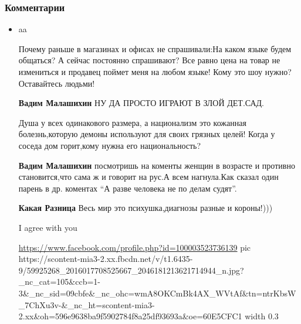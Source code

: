  
 
 
 
 
\clearpage
\subsubsection{Комментарии}
\label{sec:18_06_2020.fb.zharkih_ekaterina.1.mova_jazyk.cmt}

\begin{itemize}
\item aa


Почему раньше в магазинах и офисах не спрашивали:На каком языке будем общаться?
А сейчас постоянно спрашивают? Все равно цена на товар не измениться и продавец
поймет меня на любом языке! Кому это шоу нужно? Оставайтесь людьми!

\begin{itemize}
\textbf{Вадим Малашихин} НУ ДА ПРОСТО ИГРАЮТ В ЗЛОЙ ДЕТ.САД.

Душа у всех одинакового размера, а национализм это кожанная болезнь,которую демоны используют для своих грязных целей! Когда у соседа дом горит,кому нужна его национальность?

\textbf{Вадим Малашихин} посмотришь на коменты женщин в возрасте и противно
становится,что сама ж и говорит на рус.А всем нагнула.Как сказал один парень в
др. коментах \enquote{А разве человека не по делам судят}.

\textbf{Какая Разница} Весь мир это психушка,диагнозы разные и короны!)))
\end{itemize}

I agree with you

\url{https://www.facebook.com/profile.php?id=100003523736139}
\ifcmt
  pic https://scontent-mia3-2.xx.fbcdn.net/v/t1.6435-9/59925268_2016017708525667_2046181213621714944_n.jpg?_nc_cat=105&ccb=1-3&_nc_sid=09cbfe&_nc_ohc=wmA8OKCmBk4AX_WVtAf&tn=ntrKbsW_7ChXu3v-&_nc_ht=scontent-mia3-2.xx&oh=596e9638ba9f5902784f8a25df93693a&oe=60E5CFC1
  width 0.3
\fi


\end{itemize}
